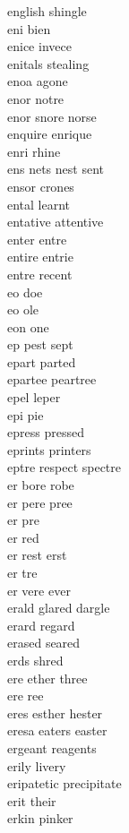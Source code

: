 english shingle\\
eni bien \\
enice invece \\
enitals stealing \\
enoa agone \\
enor notre \\
enor snore norse \\
enquire enrique\\
enri rhine \\
ens nets nest sent \\
ensor crones \\
ental learnt \\
entative attentive \\
enter entre\\
entire entrie\\
entre recent \\
eo doe \\
eo ole \\
eon one\\
ep pest sept  \\
epart parted \\
epartee peartree \\
epel leper \\
epi pie\\
epress pressed \\
eprints printers \\
eptre respect spectre  \\
er bore robe  \\
er pere pree  \\
er pre \\
er red \\
er rest erst  \\
er tre \\
er vere ever  \\
erald glared dargle \\
erard regard \\
erased seared\\
erds shred \\
ere ether three  \\
ere ree\\
eres esther hester  \\
eresa eaters easter \\
ergeant reagents \\
erily livery \\
eripatetic precipitate \\
erit their \\
erkin pinker \\
